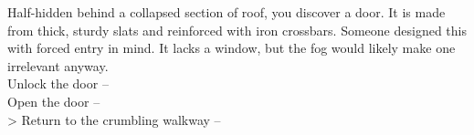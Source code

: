 Half-hidden behind a collapsed section of roof, you discover a door. It is made from thick, sturdy slats and reinforced with iron crossbars. Someone designed this with forced entry in mind. It lacks a window, but the fog would likely make one irrelevant anyway.\\

 Unlock the door -- \\
 Open the door -- \\
> Return to the crumbling walkway -- 